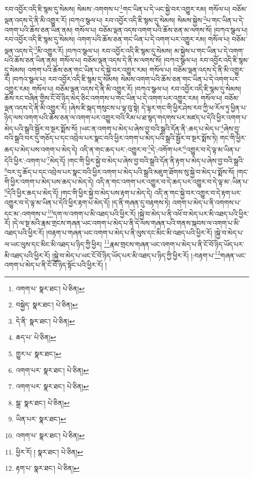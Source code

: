 རབ་འབྱོར་འདི་ཇི་སྙམ་དུ་སེམས། སེམས་:འགགས་པ་\footnote{འགག་པ་  སྣར་ཐང་།  པེ་ཅིན། }གང་ཡིན་པ་དེ་ཡང་སྐྱེ་བར་འགྱུར་རམ། གསོལ་པ། བཅོམ་ལྡན་འདས་དེ་ནི་མི་འགྱུར་རོ། །བཀའ་སྩལ་པ། རབ་འབྱོར་འདི་ཇི་སྙམ་དུ་སེམས། སེམས་སྐྱེས་\footnote{བསྐྱེད་  སྣར་ཐང་།  པེ་ཅིན། }པ་གང་ཡིན་པ་དེ་འགག་པའི་ཆོས་ཅན་ཡིན་ནམ། གསོལ་པ། བཅོམ་ལྡན་འདས་འགག་པའི་ཆོས་ཅན་མ་ལགས་སོ། །བཀའ་སྩལ་པ། རབ་འབྱོར་འདི་ཇི་སྙམ་དུ་སེམས། འགག་པའི་ཆོས་ཅན་གང་ཡིན་པ་དེ་འགག་པར་འགྱུར་རམ། གསོལ་པ། བཅོམ་ལྡན་འདས་དེ་\footnote{དེ་ནི་  སྣར་ཐང་།  པེ་ཅིན། }མི་འགྱུར་རོ། །བཀའ་སྩལ་པ། རབ་འབྱོར་འདི་ཇི་སྙམ་དུ་སེམས། མ་སྐྱེས་པ་གང་ཡིན་པ་དེ་འགག་པའི་ཆོས་ཅན་ཡིན་ནམ། གསོལ་པ། བཅོམ་ལྡན་འདས་དེ་ནི་མ་ལགས་སོ། །བཀའ་སྩལ་པ། རབ་འབྱོར་འདི་ཇི་སྙམ་དུ་སེམས། འགག་པའི་ཆོས་ཅན་གང་ཡིན་པ་དེ་སྐྱེ་བར་འགྱུར་རམ། གསོལ་པ། བཅོམ་ལྡན་འདས་དེ་ནི་མི་འགྱུར་རོ། །བཀའ་སྩལ་པ། རབ་འབྱོར་འདི་ཇི་སྙམ་དུ་སེམས། སེམས་འགག་པའི་ཆོས་ཅན་གང་ཡིན་པ་དེ་འགག་པར་འགྱུར་རམ། གསོལ་པ། བཅོམ་ལྡན་འདས་དེ་ནི་མི་འགྱུར་རོ། །བཀའ་སྩལ་པ། རབ་འབྱོར་འདི་ཇི་སྙམ་དུ་སེམས། ཆོས་རང་བཞིན་གྱིས་ངོ་བོ་ཉིད་མེད་ཅིང་འགགས་པ་གང་ཡིན་པ་དེ་འགག་པར་འགྱུར་རམ། གསོལ་པ། བཅོམ་ལྡན་འདས་དེ་ནི་མི་འགྱུར་རོ། །ཞེས་ཇི་སྐད་གསུངས་པ་ལྟ་བུ་སྟེ། དེ་ལྟར་གང་གི་ཕྱིར་ཤེས་རབ་ཀྱི་ཕ་རོལ་ཏུ་ཕྱིན་པ་ཉིད་ལས་འགག་པའི་ཆོས་ཅན་ལ་འགག་པར་འགྱུར་བའི་རིམ་པ་ཐ་སྙད་གདགས་པར་མཛད་པ་དེའི་ཕྱིར་འགག་པ་མེད་པའི་སྒྲའི་སྦྱོར་བ་སྔར་སྨོས་སོ། །ཡང་ན་འགག་པ་མེད་པ་ཞེས་བྱ་བའི་སྒྲའི་དོན་ནི་:ཆད་པ་མེད་པ་\footnote{ཆད་པ་  པེ་ཅིན། }ཞེས་བྱ་བའི་སྒྲའི་བར་དུ་གཅོད་པ་དང་འབྲེལ་པར་སྣང་བའི་ཕྱིར་འགག་པ་མེད་པའི་སྒྲའི་སྦྱོར་བ་སྔར་སྨོས་ཏེ། གང་གི་ཕྱིར་ཆད་པ་མེད་པས་འགག་པ་མེད་དེ། འདི་ན་གང་ཆད་པར་:འགྱུར་བ་\footnote{གྱུར་པ་  སྣར་ཐང་། }དེ་:འགོག་པར་\footnote{འགག་པར་  སྣར་ཐང་།  པེ་ཅིན། }འགྱུར་བ་དེ་ལྟ་མ་ཡིན་པ་དེའི་ཕྱིར་:འགག་པ་\footnote{འགག་པར་  སྣར་ཐང་།  པེ་ཅིན། }མེད་དོ། །གང་གི་ཕྱིར་སྐྱེ་བ་མེད་པ་ཞེས་བྱ་བའི་སྒྲའི་དོན་ནི་རྟག་པ་མེད་པ་ཞེས་བྱ་བའི་སྒྲའི་\footnote{སྒྲ་  སྣར་ཐང་།  པེ་ཅིན། }བར་དུ་ཆོད་པ་དང་འབྲེལ་པར་སྣང་བའི་ཕྱིར་འགག་པ་མེད་པའི་སྒྲའི་མཇུག་ཐོགས་སུ་སྐྱེ་བ་མེད་པ་སྨོས་སོ། །གང་གི་ཕྱིར་འགག་པ་མེད་པས་ཆད་པ་མེད་དེ། འདི་ན་གང་འགག་པར་འགྱུར་བ་དེ་ཆད་པར་འགྱུར་བ་དེ་ལྟ་མ་:ཡིན་པ་\footnote{ཡིན་པར་  སྣར་ཐང་། }དེའི་ཕྱིར་ཆད་པ་མེད་དོ། །གང་གི་ཕྱིར་སྐྱེ་བ་མེད་པས་རྟག་པ་མེད་དེ། འདི་ན་གང་སྐྱེ་བར་འགྱུར་བ་དེ་རྟག་པར་འགྱུར་བ་དེ་ལྟ་མ་ཡིན་པ་དེའི་ཕྱིར་རྟག་པ་མེད་དོ། །ད་ནི་གཞན་དུ་བརྟགས་ཏེ། འགག་པ་མེད་པ་ནི་འགགས་པ་དང་མ་:འགགས་པ་\footnote{འགག་པ་  སྣར་ཐང་།  པེ་ཅིན། }དག་ལ་འགག་པ་མི་འཐད་པའི་ཕྱིར་རོ། །སྐྱེ་བ་མེད་པ་ནི་འཕོ་བ་མེད་པར་མི་འཐད་པའི་ཕྱིར་རོ། །དེ་ལ་སྔ་མའི་རྣམ་གྲངས་གཞན་ཡང་འགག་པ་མེད་པ་ནི་དེ་ལས་གཞན་པའི་གནས་སྐབས་ལ་འགག་པ་མི་འཐད་པའི་ཕྱིར་རོ། །བརྟག་པ་གཞན་ཡང་འགག་པ་མེད་པ་ནི་ལུས་དང་མིང་མི་འཐད་པའི་ཕྱིར་རོ། །སྐྱེ་བ་མེད་པ་ལ་ཡང་ལུས་དང་མིང་མི་འཐད་པ་ཉིད་ཀྱི་ཕྱིར། \footnote{ཕྱིར་རོ། །   སྣར་ཐང་།  པེ་ཅིན། }རྣམ་གྲངས་གཞན་ཡང་འགག་པ་མེད་པ་ནི་ངོ་བོ་ཉིད་ཡོད་པར་མི་འཐད་པའི་ཕྱིར་རོ། །སྐྱེ་བ་མེད་པ་ཡང་ངོ་བོ་ཉིད་ཡོད་པར་མི་འཐད་པ་ཉིད་ཀྱི་ཕྱིར་རོ། །:བརྟག་པ་\footnote{རྟག་པ་  སྣར་ཐང་།  པེ་ཅིན། }གཞན་ཡང་འགག་པ་མེད་པ་ནི་ངོ་བོ་ཉིད་སྟོང་པའི་ཕྱིར་རོ། །
